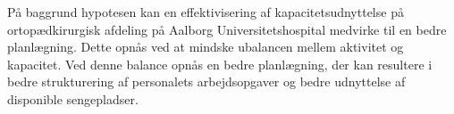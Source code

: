 På baggrund hypotesen kan en effektivisering af kapacitetsudnyttelse på ortopædkirurgisk afdeling på Aalborg Universitetshospital medvirke til en bedre planlægning. Dette opnås ved at mindske ubalancen mellem aktivitet og kapacitet. Ved denne balance opnås en bedre planlægning, der kan resultere i bedre strukturering af personalets arbejdsopgaver og bedre udnyttelse af disponible sengepladser. 






